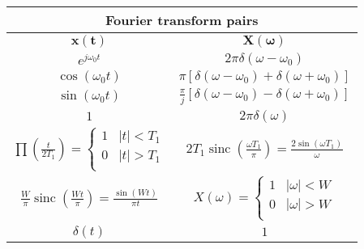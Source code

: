 \documentclass[en]{article}
\DeclareMathOperator{\sinc}{sinc}
\begin{document}
\begin{center}


    \renewcommand{\arraystretch}{1.5}
    \begin{tabular}{|c|c|}
        \multicolumn{2}{c}{{\bf Fourier transform pairs }} \\
        \hline
        $\mathbf{x(t)}$ & $\mathbf{X(\omega)}$ \\
        \hline
        $e^{j\omega_0 t }$ & $2\pi\delta (\omega-\omega_0)$ \\
        \hline
        $\cos(\omega_0 t)$ & $\pi \left [ \delta(\omega-\omega_0 ) + \delta(\omega+\omega_0 ) \right ]$\\
        \hline
        $\sin(\omega_0 t)$ & $\displaystyle\frac{\pi}{j} \left [ \delta(\omega-\omega_0 ) - \delta(\omega+\omega_0 ) \right ]$\\
        \hline
        $1$ & $2\pi\delta(\omega)$ \\
        \hline
        $\prod \left ( \displaystyle\frac{t}{2T_1}\right ) = \left \{ \begin{array}{lc} 1 & |t| < T_1 \\ 0 & |t| >T_1 \\ \end{array} \right.$ & $2 T_1 \sinc\left ( \displaystyle\frac{\omega T_1}{\pi} \right ) = \displaystyle\frac{2 \sin(\omega T_1)}{\omega}$ \\
        \hline 
        $\displaystyle\frac{W}{\pi} \sinc\left ( \displaystyle\frac{Wt}{\pi} \right ) = \displaystyle\frac{\sin(Wt)}{\pi t}$ & $X(\omega) = \left \{ \begin{array}{lc} 1 & |\omega| < W \\ 0 & |\omega| >W \\ \end{array} \right. $ \\ 
        \hline 
        $\delta(t)$ & $1$ \\

\end{tabular}
\end{center}
\end{document}
